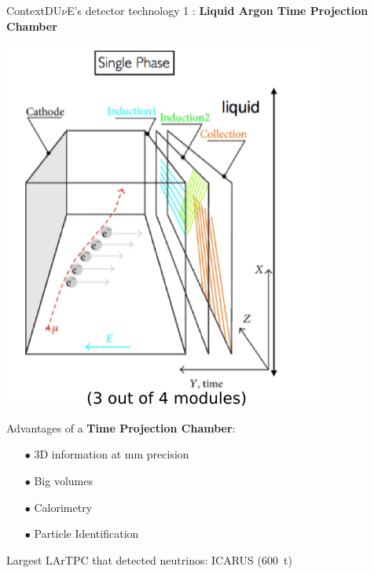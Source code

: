 \documentclass[10pt]{beamer}
\begin{document}
    \begin{frame}{Context}{DU$\nu$E's detector technology 1 : \textbf{Liquid Argon Time Projection Chamber}}
    	\begin{scriptsize}
    		\begin{minipage}{0.48\textwidth}
    			\includegraphics[width=\textwidth]{figures/contexte/lartpc.png}\\
    		\end{minipage}
    		\hfill
    		\begin{minipage}{0.48\textwidth}
    			Advantages of a \textbf{Time Projection Chamber}:    			
    			\begin{itemize}
    				\item[$\bullet$] 3D information at \si{\milli\meter} precision
    				\item[$\bullet$] Big volumes
    				\item[$\bullet$] Calorimetry
    				\item[$\bullet$] Particle Identification
    			\end{itemize}    			
    			Largest LArTPC that detected neutrinos: ICARUS (\SI{600}{\tonne})\\
    			

\end{minipage}
\end{scriptsize}
\end{frame}
\end{document}
